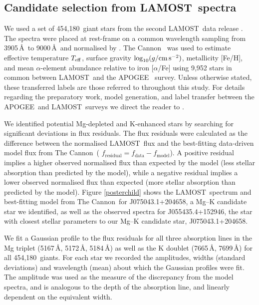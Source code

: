 \documentclass[a4paper,fleqn,usenatbib]{mnras}
\newcommand{\LamostGiants}{454,180}
\newcommand{\project}[1]{#1}
\newcommand{\lamost}{\project{LAMOST}}
\newcommand{\apogee}{\project{APOGEE}}
\newcommand{\tc}{\project{The Cannon}}
\newcommand{\teff}{T_{\rm eff}}
\newcommand{\logg}{\log_{10}(g/{\rm cm\,s}^{-2})}
\begin{document}
\subsection{Candidate selection from \lamost\ spectra}
We used a set of \LamostGiants\ giant stars from the second \lamost\ data release \citep{luo2016vizier}. The spectra were placed at rest-frame on a common wavelength sampling from 3905\,\AA\ to 9000\,\AA\ and normalised by \citet{ho2017}. \tc\ \citep{ness2016,ho2017} was used to estimate effective temperature $\teff$, surface gravity $\logg$, metallicity [Fe/H], and mean $\alpha$-element abundance relative to iron [$\alpha$/Fe] using 9,952 stars in common between \lamost\ and the \apogee\ \citep{alam2015} survey. Unless otherwise stated, these transferred labels are those referred to throughout this study. For details regarding the preparatory work, model generation, and label transfer between the \apogee\ and \lamost\ surveys we direct the reader to \citet{ho2017}. 

We identified potential Mg-depleted and K-enhanced stars by searching for significant deviations in flux residuals. The flux residuals were calculated as the difference between the normalised \lamost\ flux and the best-fitting data-driven model flux from \tc\ ( $f_{\textrm{residual}} = f_{\textrm{data}} - f_{\textrm{model}}$). A positive residual implies a higher observed normalised flux than expected by the model (less stellar absorption than predicted by the model), while a negative residual implies a lower observed normalised flux than expected (more stellar absorption than predicted by the model). Figure \ref{posterchild} shows the \lamost\ spectrum and best-fitting model from \tc\ for J075043.1+204658, a Mg--K candidate star we identified, as well as the observed spectra for J055435.4+152946, the star with closest stellar parameters to our Mg--K candidate star, J075043.1+204658. 

We fit a Gaussian profile to the flux residuals for all three absorption lines in the Mg triplet (5167\,\AA, 5172\,\AA, 5184\,\AA) as well as the K doublet (7665\,\AA, 7699\,\AA) for all \LamostGiants\ giants. For each star we recorded the amplitudes, widths (standard deviations) and wavelength (mean) about which the Gaussian profiles were fit. The amplitude was used as the measure of the discrepancy from the model spectra, and is analogous to the depth of the absorption line, and linearly dependent on the equivalent width. %
\end{document}
